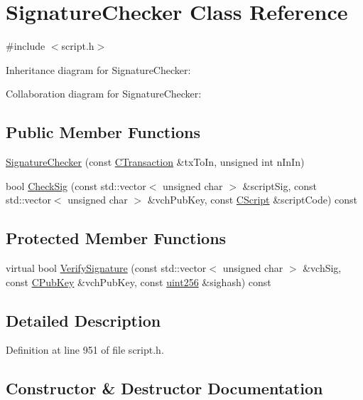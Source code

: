 \hypertarget{class_signature_checker}{}\section{Signature\+Checker Class Reference}
\label{class_signature_checker}


{\ttfamily \#include $<$script.\+h$>$}



Inheritance diagram for Signature\+Checker\+:


Collaboration diagram for Signature\+Checker\+:
\subsection*{Public Member Functions}
\begin{DoxyCompactItemize}
\item 
\hyperlink{class_signature_checker_a698e6832345449c494a12960f173d6a1}{Signature\+Checker} (const \hyperlink{class_c_transaction}{C\+Transaction} \&tx\+To\+In, unsigned int n\+In\+In)
\item 
bool \hyperlink{class_signature_checker_a174607620e5510a69f9083ed68e01776}{Check\+Sig} (const std\+::vector$<$ unsigned char $>$ \&script\+Sig, const std\+::vector$<$ unsigned char $>$ \&vch\+Pub\+Key, const \hyperlink{class_c_script}{C\+Script} \&script\+Code) const 
\end{DoxyCompactItemize}
\subsection*{Protected Member Functions}
\begin{DoxyCompactItemize}
\item 
virtual bool \hyperlink{class_signature_checker_a93e6518f83ea215af9c3266de43b5df1}{Verify\+Signature} (const std\+::vector$<$ unsigned char $>$ \&vch\+Sig, const \hyperlink{class_c_pub_key}{C\+Pub\+Key} \&vch\+Pub\+Key, const \hyperlink{classuint256}{uint256} \&sighash) const 
\end{DoxyCompactItemize}


\subsection{Detailed Description}


Definition at line 951 of file script.\+h.



\subsection{Constructor \& Destructor Documentation}
\hypertarget{class_signature_checker_a698e6832345449c494a12960f173d6a1}{}

